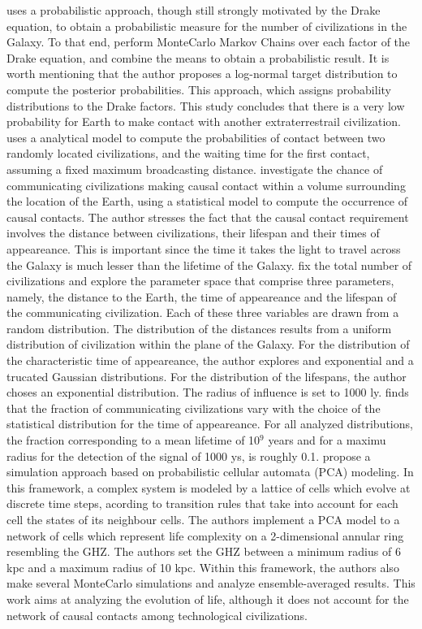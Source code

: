 \citet{bloetscher_using_2019} uses a probabilistic approach, though
still strongly motivated by the Drake equation, to obtain a
probabilistic measure for the number of civilizations in the Galaxy.
%
To that end, perform MonteCarlo Markov Chains over each factor of the
Drake equation, and combine the means to obtain a probabilistic
result.
%
It is worth mentioning that the author proposes a log-normal target
distribution to compute the posterior probabilities.
%
This approach, which assigns probability distributions to the Drake
factors.
%
This study concludes that there is a very low probability for Earth to
make contact with another extraterrestrail civilization.    
%
\citet{smith_broadcasting_2009} uses a analytical model to compute the
probabilities of contact between two randomly located civilizations,
and the waiting time for the first contact, assuming a fixed maximum
broadcasting distance.
% 
\citet{balbi_impact_2018} investigate the chance of communicating
civilizations making causal contact within a volume surrounding the
location of the Earth, using a statistical model to compute the
occurrence of causal contacts. The author stresses the fact that the
causal contact requirement involves the distance between
civilizations, their lifespan and their times of appeareance.  This is
important since the time it takes the light to travel across the
Galaxy is much lesser than the lifetime of the Galaxy.
%
\citet{balbi_impact_2018} fix the total number of civilizations and
explore the parameter space that comprise three parameters, namely,
the distance to the Earth, the time of appeareance and the lifespan of
the communicating civilization. Each of these three variables are
drawn from a random distribution. The distribution of the distances
results from a uniform distribution of civilization within the plane
of the Galaxy. For the distribution of the characteristic time of
appeareance, the author explores and exponential and a trucated
Gaussian distributions. For the distribution of the lifespans, the
author choses an exponential distribution. The radius of influence is
set to 1000 ly.
%
\citet{balbi_impact_2018} finds that the fraction of communicating
civilizations vary with the choice of the statistical distribution for
the time of appeareance. For all analyzed distributions, the fraction
corresponding to a mean lifetime of 10$^9$ years and for a maximu
radius for the detection of the signal of 1000 ys, is roughly 0.1.
%
\citet{vukotic_astrobiological_2012} propose a simulation approach
based on probabilistic cellular automata (PCA) modeling. In this
framework, a complex system is modeled by a lattice of cells which
evolve at discrete time steps, acording to transition rules that take
into account for each cell the states of its neighbour cells.
%
The authors implement a PCA model to a network of cells which
represent life complexity on a 2-dimensional annular ring resembling
the GHZ. The authors set the GHZ between a minimum radius of 6 kpc and
a maximum radius of 10 kpc. Within this framework, the authors also
make several MonteCarlo simulations and analyze ensemble-averaged
results.
%
This work aims at analyzing the evolution of life, although it does
not account for the network of causal contacts among technological
civilizations.

